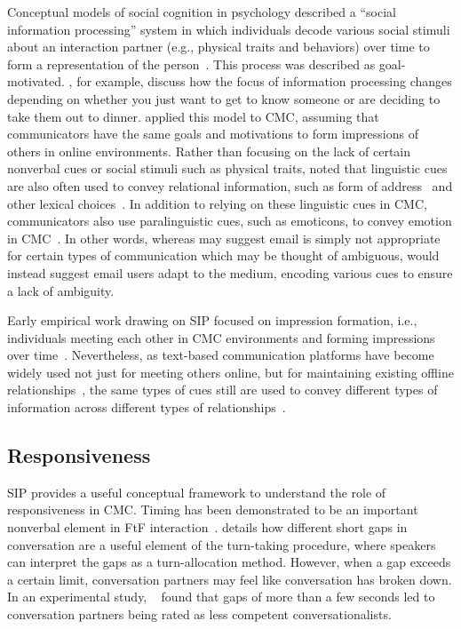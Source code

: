 \documentclass[12pt]{nuthesis}	%
\begin{document}
Conceptual models of social cognition in psychology described a ``social information processing'' system in which individuals decode various social stimuli about an interaction partner (e.g., physical traits and behaviors) over time to form a representation of the person~\citep{lord1985information}. This process was described as goal-motivated. \citet{wyer1980processing}, for example, discuss how the focus of information processing changes depending on whether you just want to get to know someone or are deciding to take them out to dinner. \citet{walther1992interpersonal} applied this model to CMC, assuming that communicators have the same goals and motivations to form impressions of others in online environments. Rather than focusing on the lack of certain nonverbal cues or social stimuli such as physical traits, \citeauthor{walther1992interpersonal} noted that linguistic cues are also often used to convey relational information, such as form of address~\citep{argyle1976gaze} and other lexical choices~\citep{wiener1968language}. In addition to relying on these linguistic cues in CMC, communicators also use paralinguistic cues, such as emoticons, to convey emotion in CMC~\citep{carey1980paralanguage,sherblom1988direction}. In other words, whereas \citet{daft1986organizational} may suggest email is simply not appropriate for certain types of communication which may be thought of ambiguous, \citeauthor{walther1992interpersonal} would instead suggest email users adapt to the medium, encoding various cues to ensure a lack of ambiguity.

Early empirical work drawing on SIP focused on impression formation, i.e., individuals meeting each other in CMC environments and forming impressions over time~\citep[e.g.,][]{hancock2001impression,markey2002interpersonal,tanis2003social}. Nevertheless, as text-based communication platforms have become widely used not just for meeting others online, but for maintaining existing offline relationships~\citep{grinter2006chatting,pettegrew2015smart}, the same types of cues still are used to convey different types of information across different types of relationships~\citep{derks2008emoticons,pirzadeh2012expression}.

\subsection{Responsiveness}
SIP provides a useful conceptual framework to understand the role of responsiveness in CMC. Timing has been demonstrated to be an important nonverbal element in FtF interaction~\citep{burgoon2016nonverbal}. \citet{mclaughlin1984conversation} details how different short gaps in conversation are a useful element of the turn-taking procedure, where speakers can interpret the gaps as a turn-allocation method. However, when a gap exceeds a certain limit, conversation partners may feel like conversation has broken down. In an experimental study, ~\citet{mclaughlin1982awkward} found that gaps of more than a few seconds led to conversation partners being rated as less competent conversationalists.
\end{document}
